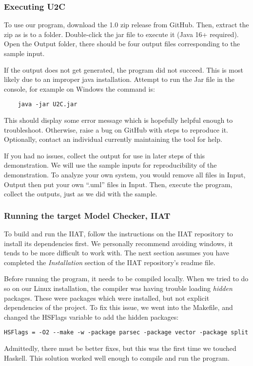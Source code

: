 \newpage
\subsubsection{Executing U2C}\label{subsubsec:exec}
To use our program, download the 1.0 zip release from GitHub. %
Then, extract the zip as is to a folder.
Double-click the jar file to execute it (Java 16+ required).
Open the Output folder, there should be four output files corresponding to the sample input.

If the output does not get generated, the program did not succeed.
This is most likely due to an improper java installation.
Attempt to run the Jar file in the console, for example on Windows the command is:
\begin{verbatim}
    java -jar U2C.jar
\end{verbatim}
This should display some error message which is hopefully helpful enough to troubleshoot.
Otherwise, raise a bug on GitHub with steps to reproduce it.
Optionally, contact an individual currently maintaining the tool for help.

If you had no issues, collect the output for use in later steps of this demonstration.
We will use the sample inputs for reproducibility of the demonstration.
To analyze your own system, you would remove all files in Input, Output then put your own ``.uml'' files in Input.
Then, execute the program, collect the outputs, just as we did with the sample.

\subsubsection{Running the target Model Checker, IIAT}\label{subsubsec:iiat-run}
To build and run the IIAT, follow the instructions on the IIAT repository to install its dependencies first. %
We personally recommend avoiding windows, it tends to be more difficult to work with.
The next section assumes you have completed the \textit{Installation} section of the IIAT repository's readme file.

Before running the program, it needs to be compiled locally.
When we tried to do so on our Linux installation, the compiler was having trouble loading \textit{hidden} packages.
These were packages which were installed, but not explicit dependencies of the project.
To fix this issue, we went into the Makefile, and changed the HSFlags variable to add the hidden packages:
\begin{verbatim}HSFlags = -O2 --make -w -package parsec -package vector -package split\end{verbatim}
Admittedly, there must be better fixes, but this was the first time we touched Haskell.
This solution worked well enough to compile and run the program.

